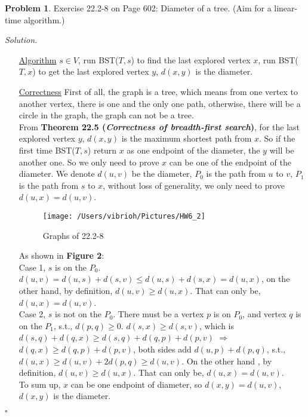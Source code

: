 \documentclass[11pt]{article}
\theoremstyle{definition}
\newtheorem{problem}{Problem}
\newenvironment{solution}{\noindent\emph{Solution.}}{\hfill$\square$}
\newcommand\tab[1][1cm]{\hspace*{#1}}
\begin{document}
\newpage



\begin{problem}
Exercise 22.2-8 on Page 602: Diameter of a tree. (Aim for a linear-time algorithm.)
\end{problem}

\begin{solution}
\begin{enumerate}

    \item[\underline{Algorithm}] $s \in V$, run BST($T, s$) to find the last explored vertex $x$, run BST($T, x$) to get the last explored vertex $y$, $d(x,y)$ is the diameter.


 \item[\underline{Correctness}] \tab First of all, the graph is a tree, which means from one vertex to another vertex, there is one and the only one path, otherwise, there will be a circle in the graph, the graph can not be a tree.\\
 \tab From \textbf{Theorem 22.5 (\textit{Correctness of breadth-first search})}, for the last explored vertex $y$, $d(x,y)$ is the maximum shortest path from $x$. So if the first time BST($T, s$) return $x$ as one endpoint of the diameter, the $y$ will be another one. So we only need to prove $x$ can be one of the endpoint of the diameter. We denote $d(u,v)$ be the diameter, $P_0$ is the path from $u$ to $v$, $P_1$ is the path from $s$ to $x$,  without loss of generality, we only need to prove $d(u,x) = d(u,v)$. \\
     \begin{figure}[htbp]
  \centering
  \texttt{[image: /Users/vibrioh/Pictures/HW6\_2]}
  \caption{Graphs of 22.2-8}
  \label{fig:shapes}
\end{figure}
\tab As shown in \textbf{Figure 2}:\\
 \tab Case 1, $s$ is on the $P_0$. $d(u,v) = d(u, s) + d(s, v) \leq d(u,s) + d(s,x) = d(u,x) $, on the other hand, by definition, $d(u,v) \geq d(u,x)$. That can only be, $d(u,x) = d(u,v)$.\\
 \tab Case 2, $s$ is not on the $P_0$. There must be a vertex $p$ is on $P_0$, and vertex $q$ is on the $P_1$, s.t., $d(p,q) \geq 0$. $d(s,x) \geq d(s,v)$, which is $d(s,q)+d(q,x) \geq d(s,q) + d(q, p) + d(p,v)$ $\Rightarrow$ $d(q,x) \geq d(q,p) +d(p, v)$, both sides add $d(u, p) + d(p, q)$, s.t., $d(u,x) \geq d(u,v) + 2d(p,q) \geq d(u,v)$. On the other hand , by definition, $d(u,v) \geq d(u, x)$. That can only be, $d(u,x) = d(u,v)$.\\
 \tab To sum up, $x$ can be one endpoint of diameter, so $d(x,y) = d(u, v)$, $d(x,y)$ is the diameter.


\end{enumerate}
\end{solution}
\end{document}
